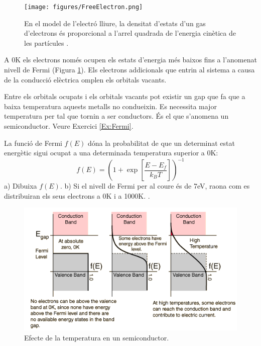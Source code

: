 \begin{figure}[h]
\centering
\texttt{[image: figures/FreeElectron.png]}
\caption[Model de l'electró lliure]{En el model de l'electró lliure, la densitat d'estats d'un gas d'electrons és proporcional a l'arrel quadrada de l'energia cinètica de les partícules \cite{yen_chemistry_2008}. }
\label{fig:FreeElectron}
\end{figure}

A 0K els electrons només ocupen els estats d'energia més baixos fins a l'anomenat nivell de Fermi (Figura \ref{fig:FreeElectron}). Els electrons addicionals que entrin al sistema a causa de la conducció elèctrica omplen els orbitals vacants.

Entre els orbitals ocupats i els orbitals vacants pot existir un gap que fa que a baixa temperatura aquests metalls no condueixin. Es necessita major temperatura per tal que tornin a ser conductors. 
És el que s'anomena un semiconductor. Veure Exercici \ref{Ex:Fermi}.

\begin{exr}
La funció de Fermi $f(E)$ dóna la probabilitat de que un determinat estat energètic sigui ocupat a una determinada temperatura superior a 0K:
\[f(E)=\left( 1 + \exp \left[ \frac{E-E_f}{k_B T} \right] \right)^{-1}\]
a) Dibuixa $f(E)$. b) Si el nivell de Fermi per al coure és de 7eV, raona com es distribuiran els seus electrons a 0K i a 1000K.
\label{Ex:Fermi}.
\end{exr}

\begin{figure}[h]
\centering
\includegraphics[scale=0.7]{figures/FermiBand.png}
\caption{Efecte de la temperatura en un semiconductor.}
\label{fig:FermiBand}
\end{figure}

